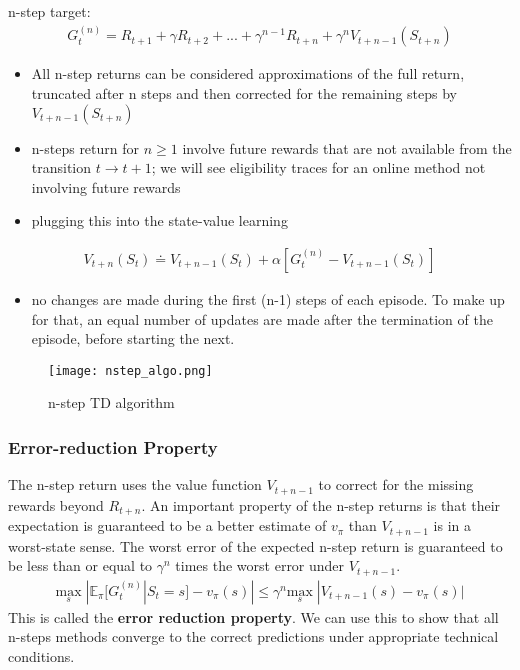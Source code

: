\documentclass[sutton_barto_notes.tex]{subfiles}
\begin{document}
n-step target:
\begin{align}
G_t^{(n)} = R_{t+1} + \gamma R_{t+2} + ... + \gamma^{n-1} R_{t+n} + \gamma^n V_{t+n-1}(S_{t+n}) \label{eq:7.3}\tag{7.3}
\end{align}

\begin{itemize}
\item All n-step returns can be considered approximations of the full return, truncated after n steps and then corrected for the remaining steps by $V_{t+n-1}(S_{t+n})$
\item n-steps return for $n \geq 1$ involve future rewards that are not available from the transition $t \rightarrow t + 1$; we will see eligibility traces for an online method not involving future rewards
\item plugging this into the state-value learning
\end{itemize}
\begin{align}
V_{t+n}(S_t) \doteq V_{t+n-1}(S_t) + \alpha[G_t^{(n)} - V_{t+n-1}(S_t)] \label{eq:7.4}\tag{7.4}
\end{align}
\begin{itemize}
\item no changes are made during the first (n-1) steps of each episode. To make up for that, an equal number of updates are made after the termination of the episode, before starting the next.
\end{itemize}

\begin{figure}[h!]
    \centering
     \texttt{[image: nstep\_algo.png]}
    \caption{ n-step TD algorithm }
\end{figure}

\subsubsection{Error-reduction Property}

The n-step return uses the value function $V_{t+n-1}$ to correct for the missing rewards beyond $R_{t+n}$. An important property of the n-step returns is that their expectation is guaranteed to be a better estimate of $v_\pi$ than $V_{t+n-1}$ is in a worst-state sense.
The worst error of the expected n-step return is guaranteed to be less than or equal to $\gamma^n$ times the worst error under $V_{t+n-1}$.
\begin{align}
\underset{s}{\mathrm{max}} \; | \mathbb{E}_{\pi} [G_t^{(n)} | S_t = s] - v_{\pi}(s) | \leq \gamma^n \underset{s}{\mathrm{max}} \; | V_{t+n-1}(s) - v_{\pi}(s)| \label{eq:7.5}\tag{7.5}
\end{align}
This is called the \textbf{error reduction property}. We can use this to show that all n-steps methods converge to the correct predictions under appropriate technical conditions.
\end{document}
